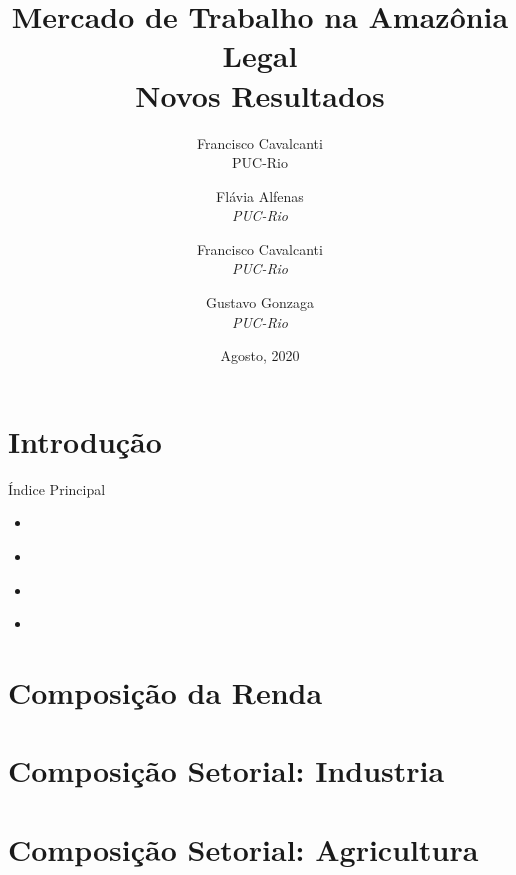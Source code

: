 \documentclass[11pt]{beamer}
\author[Francisco Cavalcanti]{Francisco Cavalcanti\\\footnotesize{PUC-Rio}
}
\author{
Flávia  Alfenas\\
\textit{PUC-Rio}\\ \vspace{3mm}
\and  
Francisco Cavalcanti\\
\textit{PUC-Rio}\\ \vspace{3mm}
\and   
Gustavo Gonzaga \\
\textit{PUC-Rio} 
}
\date{Agosto, 2020}
\title{Mercado de Trabalho na Amazônia Legal \\ Novos Resultados}
\begin{document}

\begin{frame}
\titlepage
\end{frame}


\section{Introdução}


\begin{frame}[label=indice_principal]{Índice Principal}

\begin{itemize}
\item{
	\hyperlink{_outras_rendas_composicao}{} 
	}   
		
\item{
	\hyperlink{_retrato_emprego_sgap_industria}{}
	}  
	
\item{
	\hyperlink{_retrato_emprego_sgap_agricultura}{} 
	}  
	
\item{
	\hyperlink{_outros_emprego}{}
	}  

\end{itemize}

\end{frame}


\section{Composição da Renda}



\section{Composição Setorial: Industria}



\section{Composição Setorial: Agricultura}
\end{document}
